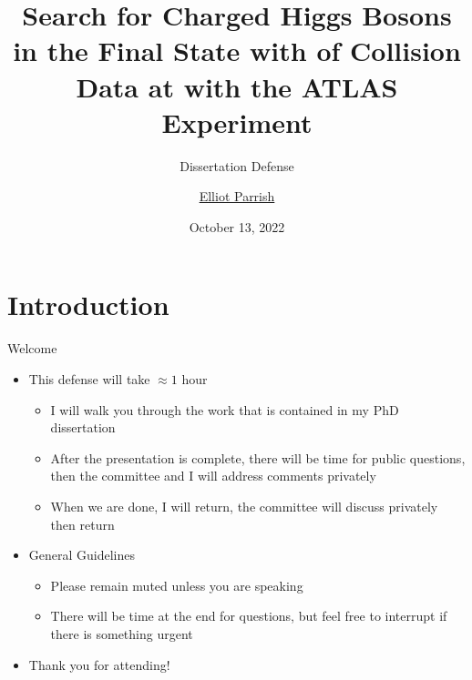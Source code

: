 \documentclass[aspectratio=169,xcolor=table]{beamer}
\title[Search for \HpmLong with ATLAS]
{Search for Charged Higgs Bosons in the \HpmLong Final State with \LUMI of \pp Collision Data at \sqs with the ATLAS Experiment}
\subtitle{Dissertation Defense}
\author[Elliot Parrish]
{\texorpdfstring{\underline{Elliot Parrish}}{Elliot Parrish}\inst{\dag}}
\institute[NIU] {\inst{\dag}Northern Illinois University, USA}
\date{October 13, 2022}
\begin{document}
\frame{\titlepage}




\begin{frame}{\contentsname}
  \begin{multicols}{4}
    \tableofcontents
  \end{multicols}
\end{frame}

\section{Introduction }
  
  \begin{frame}[t]{Welcome}
    \begin{itemize}
      \item This defense will take $\approx 1$ hour
      \begin{itemize}
        \item I will walk you through the work that is contained in my PhD dissertation
        \item After the presentation is complete, there will be time for public questions, then the committee and I will address comments privately
        \item When we are done, I will return, the committee will discuss privately then return
      \end{itemize}
      \item General Guidelines
      \begin{itemize}
        \item Please remain muted unless you are speaking
        \item There will be time at the end for questions, but feel free to interrupt if there is something urgent
      \end{itemize}
      \item Thank you for attending!
    \end{itemize}
  \end{frame}
\end{document}
